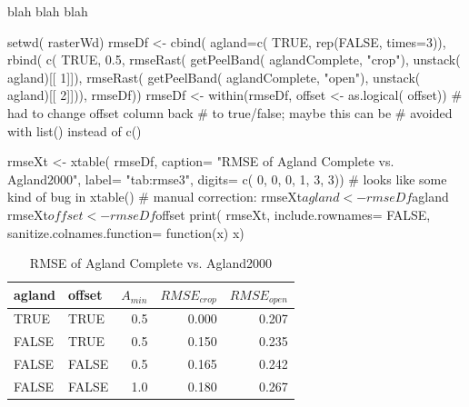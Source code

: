 blah blah blah

\begin{Schunk}
\begin{Sinput}
 setwd( rasterWd)  
 rmseDf <- 
   cbind( agland=c( TRUE, rep(FALSE, times=3)),
         rbind( c( TRUE, 0.5,
                  rmseRast( getPeelBand( aglandComplete, "crop"),
                           unstack( agland)[[ 1]]),
                  rmseRast( getPeelBand( aglandComplete, "open"),
                           unstack( agland)[[ 2]])),
               rmseDf))
 rmseDf <- within(rmseDf, offset <- as.logical( offset))
                                         # had to change offset column back
                                         # to true/false;  maybe this can be
                                         # avoided with list() instead of c()
 
 rmseXt <- xtable( rmseDf,
                  caption= "RMSE of Agland Complete vs. Agland2000",
                  label= "tab:rmse3",
                  digits= c( 0, 0, 0, 1, 3, 3))
                                         # looks like some kind of bug in xtable()
                                         # manual correction:
 rmseXt$agland <- rmseDf$agland
 rmseXt$offset <- rmseDf$offset
 print( rmseXt,
       include.rownames= FALSE,
       sanitize.colnames.function= function(x) x)
\end{Sinput}
\begin{table}[ht]
\begin{center}
\begin{tabular}{llrrr}
  \hline
agland & offset & $A_{min}$ & $RMSE_{crop}$ & $RMSE_{open}$ \\ 
  \hline
TRUE & TRUE & 0.5 & 0.000 & 0.207 \\ 
  FALSE & TRUE & 0.5 & 0.150 & 0.235 \\ 
  FALSE & FALSE & 0.5 & 0.165 & 0.242 \\ 
  FALSE & FALSE & 1.0 & 0.180 & 0.267 \\ 
   \hline
\end{tabular}
\caption{RMSE of Agland Complete vs. Agland2000}
\label{tab:rmse3}
\end{center}
\end{table}\begin{Sinput}
 
\end{Sinput}
\end{Schunk}


